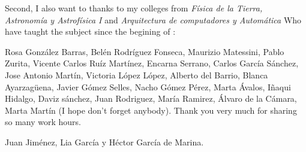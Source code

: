 \begin{paracol}{2}
\switchcolumn
Second, I also want to thanks to my colleges from \emph{Física de la Tierra, Astronomía y Astrofísica I} and  \emph{Arquitectura de computadores y Automática} Who have taught the subject since the begining of : 

Rosa González Barras, Belén Rodríguez Fonseca, Maurizio Matessini, Pablo Zurita, Vicente Carlos Ruíz Martínez, Encarna Serrano, Carlos García Sánchez, Jose Antonio Martín, Victoria López López,  Alberto del Barrio, Blanca Ayarzagüena, Javier Gómez Selles, Nacho Gómez Pérez, Marta Ávalos, Iñaqui Hidalgo, Daviz sánchez,  Juan Rodriguez, María Ramirez, Álvaro de la Cámara, Marta Martín (I hope don't forget anybody). Thank you very much for sharing so many work hours.

\end{paracol}

\begin{flushright}
Juan Jiménez, Lia García y Héctor García de Marina.
\end{flushright}

